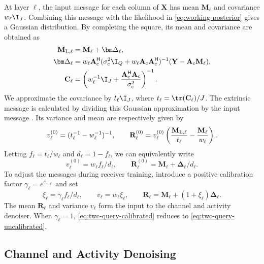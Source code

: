 At layer $\ell$, the input message for each column of $\mathbf X$
has mean $\mathbf M_\ell$ and covariance $w_\ell\I_J$.
Combining this message with the likelihood in
\eqref{eq:working-posterior} gives a Gaussian distribution.
By completing the square, its mean and covariance are obtained as
\begin{align}
 \mathbf M_{{\rm L},\ell}&=\mathbf M_\ell+\bm\Delta_\ell,
 \label{eq:twc-linear-mean}\\
 \bm\Delta_\ell&=w_\ell\mathbf A_{\rm c}^{\mathsf H}
 (\sigma_{\rm c}^2\I_Q+w_\ell\mathbf A_{\rm c}\mathbf A_{\rm c}^{\mathsf H})^{-1}
 (\mathbf Y-\mathbf A_{\rm c}\mathbf M_\ell),
 \label{eq:twc-linear-correction}\\
 \mathbf C_\ell
 &=\left(w_\ell^{-1}\I_J+
 \frac{\mathbf A_{\rm c}^{\mathsf H}\mathbf A_{\rm c}}{\sigma_{\rm c}^2}
 \right)^{-1}.
 \label{eq:twc-linear-covariance}
\end{align}
We approximate the covariance by $t_\ell\I_J$, where
$t_\ell=\tr(\mathbf C_\ell)/J$. The extrinsic message is calculated
by dividing this Gaussian approximation by the input message
\cite{minka2001}. Its variance and mean are respectively given by
\begin{equation}
 v_\ell^{(0)}=(t_\ell^{-1}-w_\ell^{-1})^{-1},\qquad
 \mathbf R_\ell^{(0)}=v_\ell^{(0)}
 \left(\frac{\mathbf M_{{\rm L},\ell}}{t_\ell}
       -\frac{\mathbf M_\ell}{w_\ell}\right).
 \label{eq:twc-linear-extrinsic}
\end{equation}
Letting $f_\ell=t_\ell/w_\ell$ and $d_\ell=1-f_\ell$, we can
equivalently write
\begin{equation}
 v_\ell^{(0)}=w_\ell f_\ell/d_\ell,\qquad
 \mathbf R_\ell^{(0)}=\mathbf M_\ell+\bm\Delta_\ell/d_\ell.
 \label{eq:twc-query-uncalibrated}
\end{equation}
To adjust the messages during receiver training, introduce a positive
calibration factor $\gamma_\ell=e^{c_{\gamma,\ell}}$ and set
\begin{equation}
 \xi_\ell=\gamma_\ell f_\ell/d_\ell,\qquad
 v_\ell=w_\ell\xi_\ell,\qquad
 \mathbf R_\ell=\mathbf M_\ell+(1+\xi_\ell)\bm\Delta_\ell.
 \label{eq:twc-query-calibrated}
\end{equation}
The mean $\mathbf R_\ell$ and variance $v_\ell$ form the input to the
channel and activity denoiser. When $\gamma_\ell=1$,
\eqref{eq:twc-query-calibrated} reduces to
\eqref{eq:twc-query-uncalibrated}.

\subsection{Channel and Activity Denoising}

